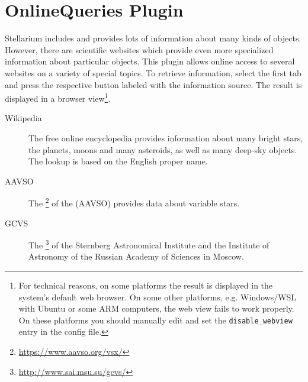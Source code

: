 % 

\newpage
\section{OnlineQueries Plugin}
\label{sec:plugins:OnlineQueries}

Stellarium includes and provides lots of information about many kinds
of objects. However, there are scientific websites which provide even
more specialized information about particular objects. This plugin 
\citep{Zotti-etal:SEAC2021} allows online access to several websites on a
variety of special topics. To retrieve information, select the
first tab and press the respective button labeled with the information source. 
The result is displayed in a browser view\footnote{%
  For technical reasons, on some platforms the
  result is displayed in the system's default web browser.  On some
  other platforms, e.g. Windows/WSL with Ubuntu or some ARM computers, the
  web view fails to work properly.  On these platforms you should
  manually edit  and set the
  \texttt{disable\_webview} entry in the config file.}.

\begin{description}
\item[Wikipedia] The free online encyclopedia provides information
  about many bright stars, the planets, moons and many asteroids, as
  well as many deep-sky objects. The lookup is based on the English
  proper name.
\item[AAVSO] The \footnote{\url{https://www.aavso.org/vsx/}} of the
   (AAVSO)
  provides data about variable stars.
\item[GCVS] The \footnote{\url{http://www.sai.msu.su/gcvs/}} of the Sternberg
  Astronomical Institute and the Institute of Astronomy of the Russian
  Academy of Sciences in Moscow.
\end{description}

